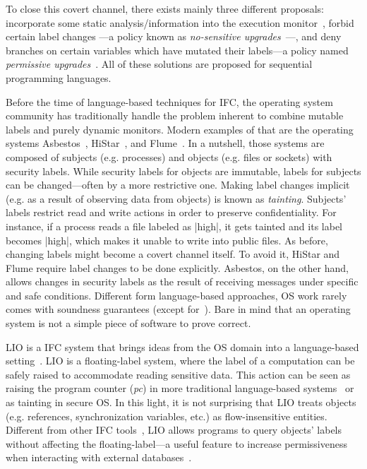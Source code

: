 To close this covert channel, there exists mainly three different proposals:
incorporate some static analysis/information into the execution
monitor~\citep{Russo:2010,stefan:lio,10.1109/SP.2013.10}, forbid certain label
changes ---a policy known as \emph{no-sensitive
  upgrades}~\citep{Austin:Flanagan:PLAS10}---, and deny branches on certain
variables which have mutated their labels---a policy named \emph{permissive
  upgrades}~\citep{Austin:Flanagan:PLAS10}. All of these solutions are proposed
for sequential programming languages.


Before the time of language-based techniques for IFC, the operating system
community has traditionally handle the problem inherent to combine mutable
labels and purely dynamic monitors. Modern examples of that are the operating
systems Asbestos~\citep{Efstathopoulos:2005}, HiStar~\citep{zeldovich:histar},
and Flume~\citep{krohn:flume}. In a nutshell, those systems are composed of
subjects (e.g. processes) and objects (e.g. files or sockets) with security
labels. While security labels for objects are immutable, labels for subjects can
be changed---often by a more restrictive one. Making label changes implicit
(e.g. as a result of observing data from objects) is known as
\emph{tainting}. Subjects' labels restrict read and write actions in order to
preserve confidentiality. For instance, if a process reads a file labeled as
|high|, it gets tainted and its label becomes |high|, which makes it unable to
write into public files. As before, changing labels might become a covert
channel itself. To avoid it, HiStar and Flume require label changes to be done
explicitly.  Asbestos, on the other hand, allows changes in security labels as
the result of receiving messages under specific and safe conditions. Different
form language-based approaches, OS work rarely comes with soundness guarantees
(except for~\citep{Krohn,seL4IF}). Bare in mind that an operating system is not
a simple piece of software to prove correct.


LIO is a IFC system that brings ideas from the OS domain into a language-based
setting~\citep{stefan:lio,stefan:addressing-covert}.  LIO is a floating-label
system, where the label of a computation can be safely raised to accommodate
reading sensitive data. This action can be seen as raising the program counter
(\emph{pc}) in more traditional language-based
systems~\citep{sabelfeld:language-based-iflow} or as tainting in secure OS.  In
this light, it is not surprising that LIO treats objects (e.g. references,
synchronization variables, etc.) as flow-insensitive entities. Different from
other IFC tools~\citep{jif,FlowCaml,Hedin13}, LIO allows programs to query
objects' labels without affecting the floating-label---a useful feature to
increase permissiveness when interacting with external databases~\citep{giffin:hails}.

